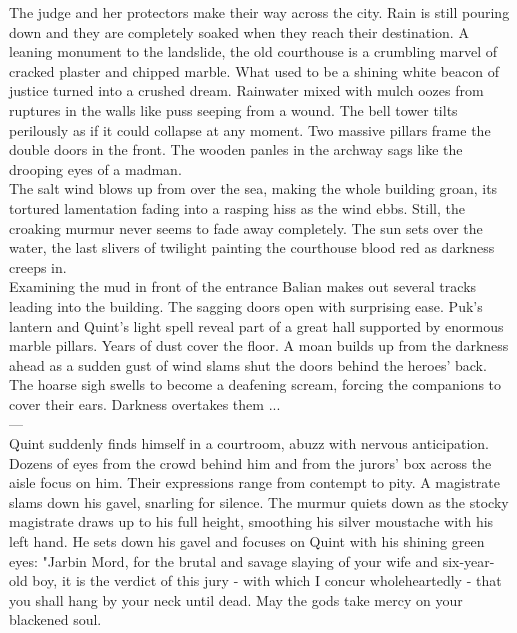 The judge and her protectors make their way across the city. Rain is still pouring down and they are completely soaked when they reach their destination. A leaning monument to the landslide, the old courthouse is a crumbling marvel of cracked plaster and chipped marble. What used to be a shining white beacon of justice turned into a crushed dream. Rainwater mixed with mulch oozes from ruptures in the walls like puss seeping from a wound. The bell tower tilts perilously as if it could collapse at any moment. Two massive pillars frame the double doors in the front. The wooden panles in the archway sags like the drooping eyes of a madman.\\

The salt wind blows up from over the sea, making the whole building groan, its tortured lamentation fading into a rasping hiss as the wind ebbs. Still, the croaking murmur never seems to fade away completely. The sun sets over the water, the last slivers of twilight painting the courthouse blood red as darkness creeps in.\\

Examining the mud in front of the entrance Balian makes out several tracks leading into the building. The sagging doors open with surprising ease. Puk's lantern and Quint's light spell reveal part of a great hall supported by enormous marble pillars. Years of dust cover the floor. A moan builds up from the darkness ahead as a sudden gust of wind slams shut the doors behind the heroes' back. The hoarse sigh swells to become a deafening scream, forcing the companions to cover their ears. Darkness overtakes them ...\\

---\\

Quint suddenly finds himself in a courtroom, abuzz with nervous anticipation. Dozens of eyes from the crowd behind him and from the jurors' box across the aisle focus on him. Their expressions range from contempt to pity. A magistrate slams down his gavel, snarling for silence. The murmur quiets down as the stocky magistrate draws up to his full height, smoothing his silver moustache with his left hand. He sets down his gavel and focuses on Quint with his shining green eyes: "Jarbin Mord, for the brutal and savage slaying of your wife and six-year-old boy, it is the verdict of this jury - with which I concur wholeheartedly - that you shall hang by your neck until dead. May the gods take mercy on your blackened soul.\\

